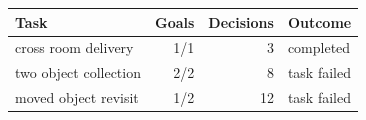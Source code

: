 \begin{tabular}{lrrl}
\toprule
Task & Goals & Decisions & Outcome \\
\midrule
cross room delivery & 1/1 & 3 & completed \\
two object collection & 2/2 & 8 & task failed \\
moved object revisit & 1/2 & 12 & task failed \\
\bottomrule
\end{tabular}
